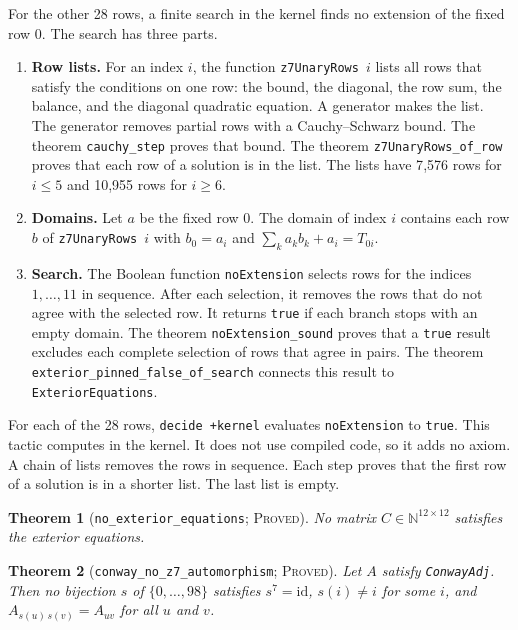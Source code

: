 \documentclass[pdflatex,sn-mathphys-num]{sn-jnl}
\theoremstyle{thmstyleone}
\newtheorem{theorem}{Theorem}[section]
\theoremstyle{thmstyletwo}
\theoremstyle{thmstylethree}
\numberwithin{equation}{section}
\begin{document}
For the other 28 rows, a finite search in the kernel finds no extension of the fixed row 0. The search has three parts.
\begin{enumerate}
 \item \textbf{Row lists.} For an index $i$, the function \texttt{z7UnaryRows}~$i$ lists all rows that satisfy the conditions on one row: the bound, the diagonal, the row sum, the balance, and the diagonal quadratic equation. A generator makes the list. The generator removes partial rows with a Cauchy--Schwarz bound. The theorem \texttt{cauchy\_step} proves that bound. The theorem \texttt{z7UnaryRows\_of\_row} proves that each row of a solution is in the list. The lists have 7{,}576 rows for $i \le 5$ and 10{,}955 rows for $i \ge 6$.
 \item \textbf{Domains.} Let $a$ be the fixed row 0. The domain of index $i$ contains each row $b$ of \texttt{z7UnaryRows}~$i$ with $b_0 = a_i$ and $\sum_k a_k b_k + a_i = T_{0i}$.
 \item \textbf{Search.} The Boolean function \texttt{noExtension} selects rows for the indices $1, \dots, 11$ in sequence. After each selection, it removes the rows that do not agree with the selected row. It returns \texttt{true} if each branch stops with an empty domain. The theorem \texttt{noExtension\_sound} proves that a \texttt{true} result excludes each complete selection of rows that agree in pairs. The theorem \texttt{exterior\_pinned\_false\_of\_search} connects this result to \texttt{ExteriorEquations}.
\end{enumerate}
For each of the 28 rows, \texttt{decide +kernel} evaluates \texttt{noExtension} to \texttt{true}. This tactic computes in the kernel. It does not use compiled code, so it adds no axiom.
A chain of lists removes the rows in sequence. Each step proves that the first row of a solution is in a shorter list. The last list is empty.

\begin{theorem}[\texttt{no\_exterior\_equations}; \textsc{Proved}]
No matrix $C \in \mathbb{N}^{12 \times 12}$ satisfies the exterior equations.
\end{theorem}

\begin{theorem}[\texttt{conway\_no\_z7\_automorphism}; \textsc{Proved}]
\label{thm:no_z7}
Let $A$ satisfy \texttt{ConwayAdj}. Then no bijection $s$ of $\{0, \dots, 98\}$ satisfies $s^7 = \mathrm{id}$, $s(i) \ne i$ for some $i$, and $A_{s(u)\,s(v)} = A_{uv}$ for all $u$ and $v$.
\end{theorem}
\end{document}
